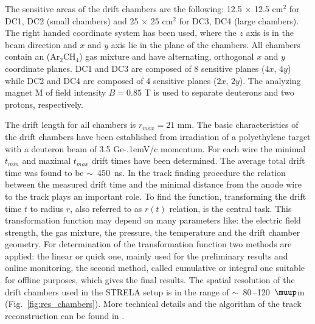 \documentclass[twocolumn,epjc3]{svjour3}
\newcommand{\GeVc}   {Ge\kern-.1emV/c\xspace}
\begin{document}
The sensitive areas of the drift chambers are the following: 12.5 $\times$ 12.5
cm$^2$ for DC1, DC2 (small chambers) and 25 $\times$ 25 cm$^2$ for DC3, DC4 (large
chambers). The right handed coordinate system has been used, where the $z$ axis
is in the beam direction and $x$ and $y$ axis lie in the plane of the
chambers. All chambers contain an (Ar$_2$CH$_4$) gas mixture and have
alternating, orthogonal $x$ and $y$ coordinate planes. DC1 and DC3 are composed
of 8 sensitive planes ($4x$, $4y$) while DC2 and DC4 are composed of 4 sensitive
planes ($2x$, $2y$). The analyzing magnet M of field intensity $B = 0.85$ T is
used to separate deuterons and two protons, respectively.

The drift length for all chambers is $r_{max} = 21$ mm. The basic
characteristics of the drift chambers have been established from irradiation of
a polyethylene target with a deuteron beam of 3.5 \GeVc momentum. For each wire
the minimal $t_{min}$ and maximal $t_{max}$ drift times have been
determined. The average total drift time was found to be $\sim$~450~ns. In the
track finding procedure the relation between the measured drift time and the
minimal distance from the anode wire to the track plays an important role. To
find the function, transforming the drift time $t$ to radius $r$, also referred
to as $r(t)$ relation, is the central task. This transformation function may
depend on many parameters like: the electric field strength, the gas mixture,
the pressure, the temperature and the drift chamber geometry. For determination
of the transformation function two methods are applied: the linear or quick one,
mainly used for the preliminary results and online monitoring, the second
method, called cumulative or integral one suitable for offline purposes, which
gives the final results. The spatial resolution of the drift chambers used in
the STRELA setup is in the range of $\sim$~80\,--120~$\muup$m
(Fig.~\ref{fig:res_chambers}). More technical details and the algorithm of the
track reconstruction can be found in \cite{gla13}.
\end{document}
